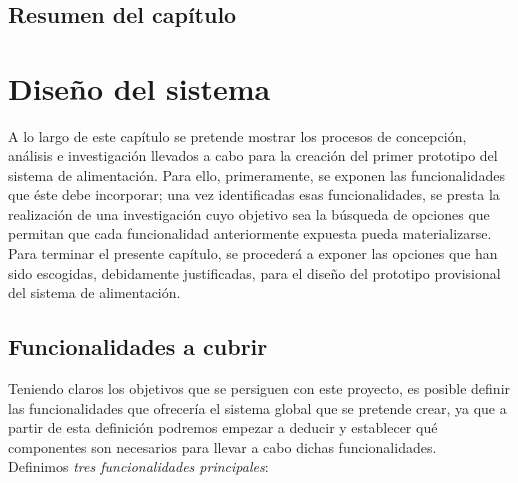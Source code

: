 \documentclass[12pt]{article}
\begin{document}
	 \\
	

	\subsection[Resumen del capítulo]{Resumen del capítulo}
	
	\pagebreak
	
	\section[Diseño del sistema]{Diseño del sistema}
	\label{Sección 3: Diseño del sistema}
	\noindent A lo largo de este capítulo se pretende mostrar los procesos de concepción, análisis e investigación llevados a cabo para la creación del primer prototipo del sistema de alimentación. Para ello, primeramente, se exponen las funcionalidades que éste debe incorporar; una vez identificadas esas funcionalidades, se presta la realización de una investigación cuyo objetivo sea la búsqueda de opciones que permitan que cada funcionalidad anteriormente expuesta pueda materializarse. Para terminar el presente capítulo, se procederá a exponer las opciones que han sido escogidas, debidamente justificadas, para el diseño del prototipo provisional del sistema de alimentación. 
	
	\subsection[Funcionalidades a cubrir]{Funcionalidades a cubrir}
	\label{subsection: funcionalidades a cubrir}
	
	\noindent Teniendo claros los objetivos que se persiguen con este proyecto, es posible definir las funcionalidades que ofrecería el sistema global que se pretende crear, ya que a partir de esta definición podremos empezar a deducir y establecer qué componentes son necesarios para llevar a cabo dichas funcionalidades. \\
	
	\noindent Definimos \textit{tres funcionalidades principales}: 
	
\end{document}
